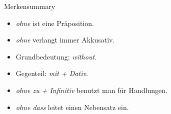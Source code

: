 \documentclass[a4paper,11pt]{article}
\begin{document}
\begin{grammarentry}{Merken}{summary}
\begin{itemize}
    \item \textit{ohne} ist eine Präposition.
    \item \textit{ohne} verlangt immer Akkusativ.
    \item Grundbedeutung: \textit{without}.
    \item Gegenteil: \textit{mit + Dativ}.
    \item \textit{ohne zu + Infinitiv} benutzt man für Handlungen.
    \item \textit{ohne dass} leitet einen Nebensatz ein.
\end{itemize}
\end{grammarentry}
\end{document}

